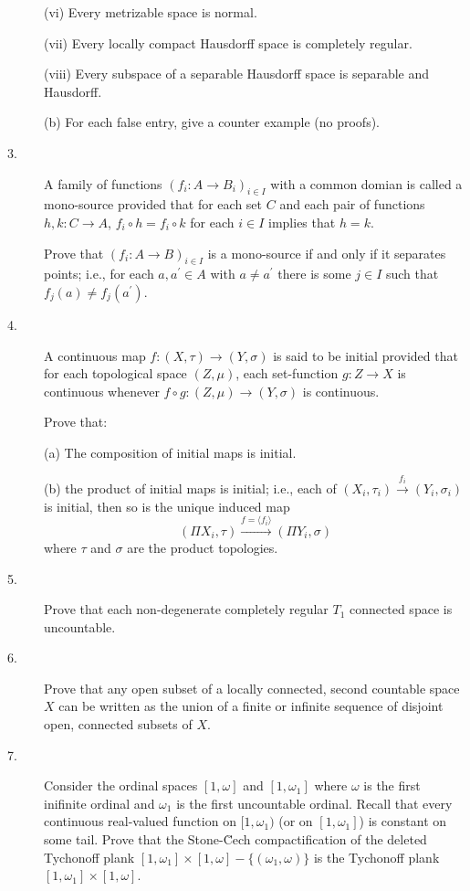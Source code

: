 \documentclass{article}
\begin{document}
\begin{description}
\item[\qquad] (vi)
Every metrizable space is normal.

\item[\qquad] (vii)
Every locally compact Hausdorff space is completely regular.

\item[\qquad] (viii)
Every subspace of a separable Hausdorff space is separable and Hausdorff.

\item[\quad] (b)
For each false entry, give a counter example (no proofs).

\item[3.]
A family of functions $(f_i : A \to B_i)_{i \in I}$ with a common domian
is called a mono-source provided that for each set $C$ and each pair of
functions $h,k: C \to A$, $f_i \circ h = f_i \circ k$
for each $i \in I$ implies that $h=k$.

Prove that $(f_i: A \to B)_{i \in I}$ is a mono-source if and only if
it separates points; i.e., for each $a, a^\prime \in A$ with
$a \neq a^\prime$ there is some $j \in I$ such that
$f_j(a) \neq f_j(a^\prime)$.

\item[4.]
A continuous map $f: (X, \tau) \to (Y, \sigma)$ is said to be initial
provided that for each topological space $(Z, \mu)$, each set-function
$g: Z \to X$ is continuous whenever $f \circ g : (Z, \mu) \to (Y, \sigma)$
is continuous.

Prove that:

\item[\quad] (a)
The composition of initial maps is initial.

\item[\quad] (b)
the product of initial maps is initial; i.e., each of
$(X_i, \tau_i) \stackrel{f_i}{\to} (Y_i, \sigma_i)$
is initial, then so is the unique induced map
$$(\Pi X_i, \tau) \stackrel{f= \langle f_i \rangle}{\longrightarrow}
  (\Pi Y_i, \sigma)$$
where $\tau$ and $\sigma$ are the product topologies.

\item[5.]
Prove that each non-degenerate completely regular $T_1$ connected space is
uncountable.

\item[6.]
Prove that any open subset of a locally connected, second countable space
$X$ can be written as the union of a finite or infinite sequence of
disjoint open, connected subsets of $X$.

\item[7.]
Consider the ordinal spaces $[1, \omega]$ and $[1, \omega_1]$ where $\omega$
is the first inifinite ordinal and $\omega_1$ is the first uncountable
ordinal. Recall that every continuous real-valued function on
$[1, \omega_1)$ (or on $[1, \omega_1]$) is constant on some tail. Prove that
the Stone-\u Cech compactification of the deleted Tychonoff plank
$[1, \omega_1] \times [1, \omega] - \{(\omega_1, \omega)\}$ is the
Tychonoff plank $[1, \omega_1] \times [1, \omega]$.


\end{description}
\end{document}
